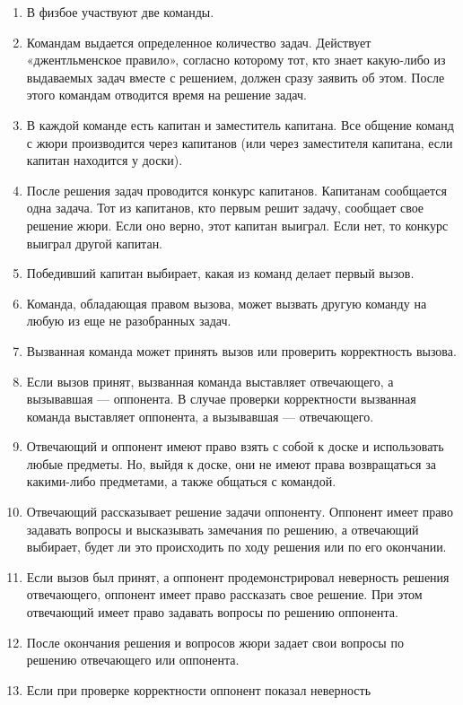 \documentclass[11pt]{article}
\newlength{\h}
\begin{document}
\begin{enumerate}
\setlength{\itemsep}{-1mm}
\item В физбое участвуют две команды.
\item Командам выдается определенное количество задач. Действует
  «джентльменское правило», согласно которому тот, кто знает
  какую-либо из выдаваемых задач вместе с решением, должен сразу
  заявить об этом. После этого командам отводится время на решение
  задач.
\item В каждой команде есть капитан и заместитель капитана. Все
  общение команд с жюри производится через капитанов (или через
  заместителя капитана, если капитан находится у доски).
\item После решения задач проводится конкурс капитанов. Капитанам
  сообщается одна задача. Тот из капитанов, кто первым решит задачу,
  сообщает свое решение жюри. Если оно верно, этот капитан
  выиграл. Если нет, то конкурс выиграл другой капитан.
\item Победивший капитан выбирает, какая из команд делает первый
  вызов.
\item Команда, обладающая правом вызова, может вызвать другую команду
  на любую из еще не разобранных задач.
\item Вызванная команда может принять вызов или проверить корректность вызова.
\item Если вызов принят, вызванная команда выставляет отвечающего, а
  вызывавшая --- оппонента. В случае проверки корректности вызванная
  команда выставляет оппонента, а вызывавшая --- отвечающего.
\item Отвечающий и оппонент имеют право взять с собой к доске и
  использовать любые предметы. Но, выйдя к доске, они не имеют права
  возвращаться за какими-либо предметами, а также общаться с командой.
\item Отвечающий рассказывает решение задачи оппоненту. Оппонент имеет
  право задавать вопросы и высказывать замечания по решению, а
  отвечающий выбирает, будет ли это происходить по ходу решения или по
  его окончании.
\item Если вызов был принят, а оппонент продемонстрировал неверность
  решения отвечающего, оппонент имеет право рассказать свое
  решение. При этом отвечающий имеет право задавать вопросы по решению
  оппонента.
\item После окончания решения и вопросов жюри задает свои вопросы по
  решению отвечающего или оппонента.
\item Если при проверке корректности оппонент показал неверность

\end{enumerate}
\end{document}
